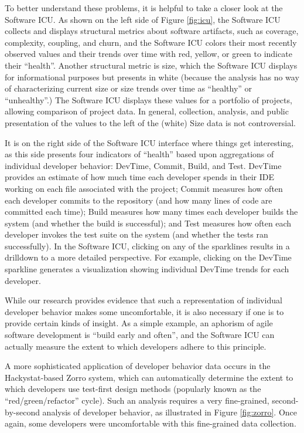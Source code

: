 \documentclass[]{article}
\begin{document}
To better understand these problems, it is helpful to take a closer look at the Software
ICU.  As shown on the left side of Figure \ref{fig:icu}, the Software ICU collects and
displays structural metrics about software artifacts, such as coverage, complexity,
coupling, and churn, and the Software ICU colors their most recently observed values and
their trends over time with red, yellow, or green to indicate their ``health''.  Another
structural metric is size, which the Software ICU displays for informational purposes but
presents in white (because the analysis has no way of characterizing current size or size
trends over time as ``healthy'' or ``unhealthy''.)  The Software ICU displays these values
for a portfolio of projects, allowing comparison of project data.  In general, collection,
analysis, and public presentation of the values to the left of the (white) Size data is
not controversial.

It is on the right side of the Software ICU interface where things get interesting, as
this side presents four indicators of ``health'' based upon aggregations of individual
developer behavior: DevTime, Commit, Build, and Test.  DevTime provides an estimate of how
much time each developer spends in their IDE working on each file associated with the
project; Commit measures how often each developer commits to the repository (and how many
lines of code are committed each time); Build measures how many times each developer
builds the system (and whether the build is successful); and Test measures how often each
developer invokes the test suite on the system (and whether the tests ran successfully).
In the Software ICU, clicking on any of the sparklines results in a drilldown to a more
detailed perspective. For example, clicking on the DevTime sparkline generates a
visualization showing individual DevTime trends for each developer.

While our research provides evidence that such a representation of individual developer
behavior makes some uncomfortable, it is also necessary if one is to provide certain kinds
of insight.  As a simple example, an aphorism of agile software development is ``build
early and often'', and the Software ICU can actually measure the extent to which
developers adhere to this principle.  

A more sophisticated application of developer behavior data occurs in the Hackystat-based
Zorro system, which can automatically determine the extent to which developers use
test-first design methods (popularly known as the ``red/green/refactor'' cycle).  Such an
analysis requires a very fine-grained, second-by-second analysis of developer behavior, as
illustrated in Figure \ref{fig:zorro}.  Once again, some developers were uncomfortable
with this fine-grained data collection. 
\end{document}

